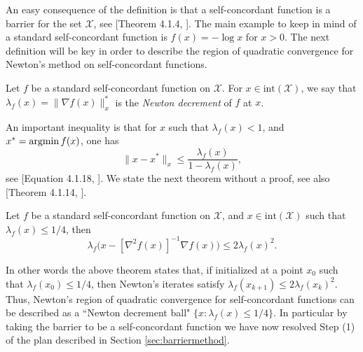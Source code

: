 An easy consequence of the definition is that a self-concordant function is a barrier for the set $\mathcal{X}$, see [Theorem 4.1.4, \cite{Nes04}]. The main example to keep in mind of a standard self-concordant function is $f(x) = - \log x$ for $x > 0$. The next definition will be key in order to describe the region of quadratic convergence for Newton's method on self-concordant functions. 

\begin{definition}
Let $f$ be a standard self-concordant function on $\mathcal{X}$. For $x \in \mathrm{int}(\mathcal{X})$, we say that $\lambda_f(x) = \|\nabla f(x)\|_x^*$ is the {\em Newton decrement} of $f$ at $x$.
\end{definition}
An important inequality is that for $x$ such that $\lambda_f(x) < 1$, and $x^* = \mathop{\mathrm{argmin}} f(x)$, one has
\begin{equation} \label{eq:trucipm3}
\|x - x^*\|_x \leq \frac{\lambda_f(x)}{1 - \lambda_f(x)} ,
\end{equation}
see [Equation 4.1.18, \cite{Nes04}]. We state the next theorem without a proof, see also [Theorem 4.1.14, \cite{Nes04}].
\begin{theorem} \label{th:NMsc}
Let $f$ be a standard self-concordant function on $\mathcal{X}$, and $x \in \mathrm{int}(\mathcal{X})$ such that $\lambda_f(x) \leq 1/4$, then
$$\lambda_f\Big(x - [\nabla^2 f(x)]^{-1} \nabla f(x)\Big) \leq 2 \lambda_f(x)^2 .$$
\end{theorem}
In other words the above theorem states that, if initialized at a point $x_0$ such that $\lambda_f(x_0) \leq 1/4$, then Newton's iterates satisfy $\lambda_f(x_{k+1}) \leq 2 \lambda_f(x_k)^2$. Thus, Newton's region of quadratic convergence for self-concordant functions can be described as a ``Newton decrement ball" $\{x : \lambda_f(x) \leq 1/4\}$. In particular by taking the barrier to be a self-concordant function we have now resolved Step (1) of the plan described in Section \ref{sec:barriermethod}. 

